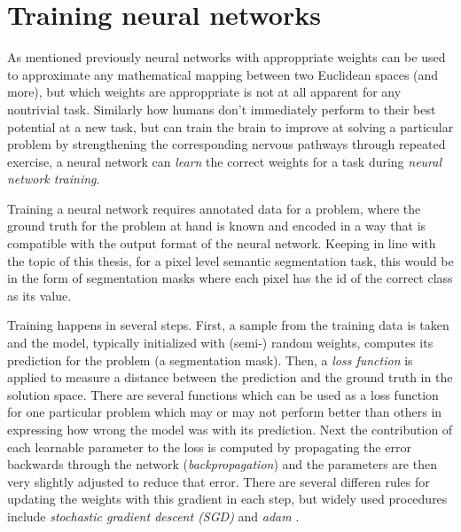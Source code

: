 \section{Training neural networks}
\label{sec:training}

As mentioned previously neural networks with approppriate weights can be used to approximate any mathematical mapping between two Euclidean spaces (and more), but which weights are approppriate is not at all apparent for any nontrivial task. Similarly how humans don't immediately perform to their best potential at a new task, but can train the brain to improve at solving a particular problem by strengthening the corresponding nervous pathways through repeated exercise, a neural network can \emph{learn} the correct weights for a task during \emph{neural network training}.

Training a neural network requires annotated data for a problem, where the ground truth for the problem at hand is known and encoded in a way that is compatible with the output format of the neural network. Keeping in line with the topic of this thesis, for a pixel level semantic segmentation task, this would be in the form of segmentation masks where each pixel has the id of the correct class as its value. 

Training happens in several steps. First, a sample from the training data is taken and the model, typically initialized with (semi-) random weights, computes its prediction for the problem (a segmentation mask). Then, a \emph{loss function} is applied to measure a distance between the prediction and the ground truth in the solution space. There are several functions which can be used as a loss function for one particular problem which may or may not perform better than others in expressing how wrong the model was with its prediction. Next the contribution of each learnable parameter to the loss is computed by propagating the error backwards through the network (\emph{backpropagation}) and the parameters are then very slightly adjusted to reduce that error. There are several differen rules for updating the weights with this gradient in each step, but widely used procedures include \emph{stochastic gradient descent (SGD)} and \emph{adam} \cite{kingmaAdamMethodStochastic2017}. 

